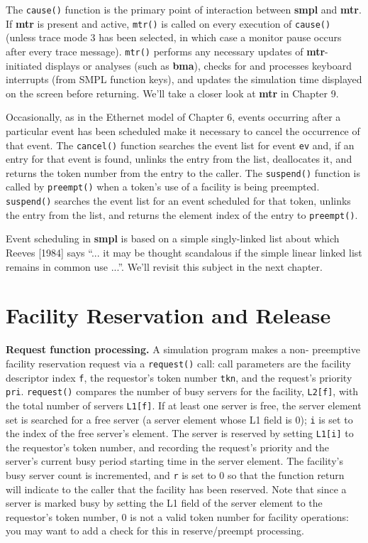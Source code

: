 The \texttt{cause()} function is the primary point of interaction between \textbf{smpl}
and \textbf{mtr}. If \textbf{mtr} is present and active, \texttt{mtr()} is called on every execution of
\texttt{cause()} (unless trace mode 3 has been selected, in which case a monitor
pause occurs after every trace message). \texttt{mtr()} performs any necessary
updates of \textbf{mtr}-initiated displays or analyses (such as \textbf{bma}), checks for and
processes keyboard interrupts (from SMPL function keys), and updates the
simulation time displayed on the screen before returning. We'll take a closer
look at \textbf{mtr} in Chapter 9.

Occasionally, as in the Ethernet model of Chapter 6, events occurring
after a particular event has been scheduled make it necessary to cancel the
occurrence of that event. The \texttt{cancel()} function searches the event list for
event \texttt{ev} and, if an entry for that event is found, unlinks the entry from the
list, deallocates it, and returns the token number from the entry to the caller.
The \texttt{suspend()} function is called by \texttt{preempt()} when a token's use of a
facility is being preempted. \texttt{suspend()} searches the event list for an event
scheduled for that token, unlinks the entry from the list, and returns the
element index of the entry to \texttt{preempt()}.

Event scheduling in \textbf{smpl} is based on a simple singly-linked list about
which Reeves [1984] says ``... it may be thought scandalous if the simple
linear linked list remains in common use ...''. We'll revisit this subject in the
next chapter.

\section{Facility Reservation and Release}

\textbf{Request function processing.} A simulation program makes a non-
preemptive facility reservation request via a \texttt{request()} call: call
parameters are the facility descriptor index \texttt{f}, the requestor's token number
\texttt{tkn}, and the request's priority \texttt{pri}. \texttt{request()} compares the number of busy
servers for the facility, \texttt{L2[f]}, with the total number of servers \texttt{L1[f]}. If
at least one server is free, the server element set is searched for a free server
(a server element whose L1 field is 0); \texttt{i} is set to the index of the free
server's element. The server is reserved by setting \texttt{L1[i]} to the requestor's
token number, and recording the request's priority and the server's current
busy period starting time in the server element. The facility's busy server
count is incremented, and \texttt{r} is set to 0 so that the function return will indicate
to the caller that the facility has been reserved. Note that since a server is
marked busy by setting the L1 field of the server element to the requestor's
token number, 0 is not a valid token number for facility operations: you may
want to add a check for this in reserve/preempt processing.

